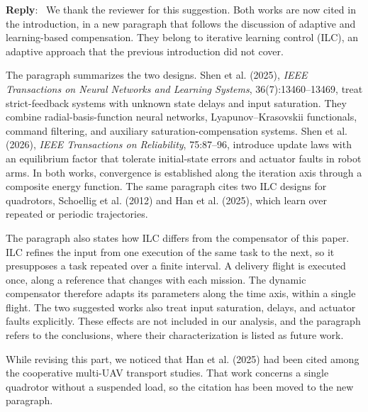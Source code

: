 \documentclass[11pt]{article}
\newcounter{reviewer}
\newenvironment{reply}
   {\medskip \noindent \color{blue} \begin{sf}\textbf{Reply}:\  }
   {\medskip \par \end{sf}}
\begin{document}
\begin{reply}
We thank the reviewer for this suggestion. Both works are now cited in the introduction, in a new paragraph that follows the discussion of adaptive and learning-based compensation. They belong to iterative learning control (ILC), an adaptive approach that the previous introduction did not cover.

The paragraph summarizes the two designs. Shen et al. (2025), \emph{IEEE Transactions on Neural Networks and Learning Systems}, 36(7):13460--13469, treat strict-feedback systems with unknown state delays and input saturation. They combine radial-basis-function neural networks, Lyapunov--Krasovskii functionals, command filtering, and auxiliary saturation-compensation systems. Shen et al. (2026), \emph{IEEE Transactions on Reliability}, 75:87--96, introduce update laws with an equilibrium factor that tolerate initial-state errors and actuator faults in robot arms. In both works, convergence is established along the iteration axis through a composite energy function. The same paragraph cites two ILC designs for quadrotors, Schoellig et al. (2012) and Han et al. (2025), which learn over repeated or periodic trajectories.

The paragraph also states how ILC differs from the compensator of this paper. ILC refines the input from one execution of the same task to the next, so it presupposes a task repeated over a finite interval. A delivery flight is executed once, along a reference that changes with each mission. The dynamic compensator therefore adapts its parameters along the time axis, within a single flight. The two suggested works also treat input saturation, delays, and actuator faults explicitly. These effects are not included in our analysis, and the paragraph refers to the conclusions, where their characterization is listed as future work.

While revising this part, we noticed that Han et al. (2025) had been cited among the cooperative multi-UAV transport studies. That work concerns a single quadrotor without a suspended load, so the citation has been moved to the new paragraph.
\end{reply}





\end{document}
